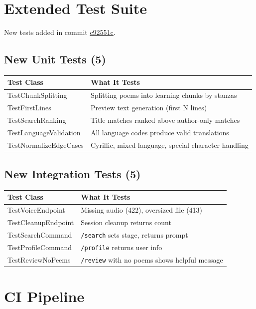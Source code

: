 \documentclass[11pt, a4paper]{article}
\begin{document}
\section{Extended Test Suite}

New tests added in commit \href{https://github.com/d13-l1t3/PoetryForYou/commit/c92551c}{c92551c}.

\subsection*{New Unit Tests (5)}
\begin{longtable}{p{4cm}p{10cm}}
\toprule
\textbf{Test Class} & \textbf{What It Tests} \\
\midrule
TestChunkSplitting & Splitting poems into learning chunks by stanzas \\
TestFirstLines & Preview text generation (first N lines) \\
TestSearchRanking & Title matches ranked above author-only matches \\
TestLanguageValidation & All language codes produce valid translations \\
TestNormalizeEdgeCases & Cyrillic, mixed-language, special character handling \\
\bottomrule
\end{longtable}

\subsection*{New Integration Tests (5)}
\begin{longtable}{p{4cm}p{10cm}}
\toprule
\textbf{Test Class} & \textbf{What It Tests} \\
\midrule
TestVoiceEndpoint & Missing audio (422), oversized file (413) \\
TestCleanupEndpoint & Session cleanup returns count \\
TestSearchCommand & \texttt{/search} sets stage, returns prompt \\
TestProfileCommand & \texttt{/profile} returns user info \\
TestReviewNoPeems & \texttt{/review} with no poems shows helpful message \\
\bottomrule
\end{longtable}

\section{CI Pipeline}
\end{document}
